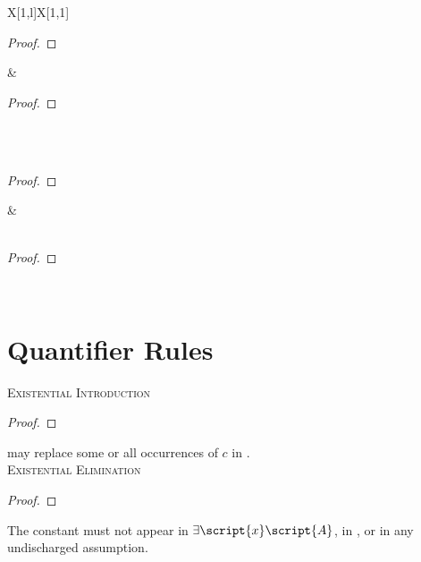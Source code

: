 \begin{longtabu}{X[1,l]X[1,1]}
\begin{proof}
	 
\end{proof}
&
\begin{proof}
	 
\end{proof}
\vspace{6pt}
\\

\\

\begin{proof}
	\open
		 
	\close
\end{proof}
&
\vspace{6pt}
\\
\\

\begin{proof}
	\open
		 
	\close
\end{proof}
\\
\end{longtabu}


\newpage[4]
\section*{Quantifier Rules}
\vspace{-9pt}
\textsc{Existential Introduction} \vspace{.5ex}
\begin{proof}	
	 \end{proof} \vspace{.5ex}
 may replace some or all occurrences of $c$ in .\\ 

\vspace{18pt}
\noindent\textsc{Existential Elimination}\vspace{.5ex}
\vspace{-9pt}
\begin{proof}	
	\open	
	\close
	 \end{proof}\vspace{.5ex}
The constant  must not appear in $\exists\script{x}\script{A}$, in , or in any undischarged assumption.\\

